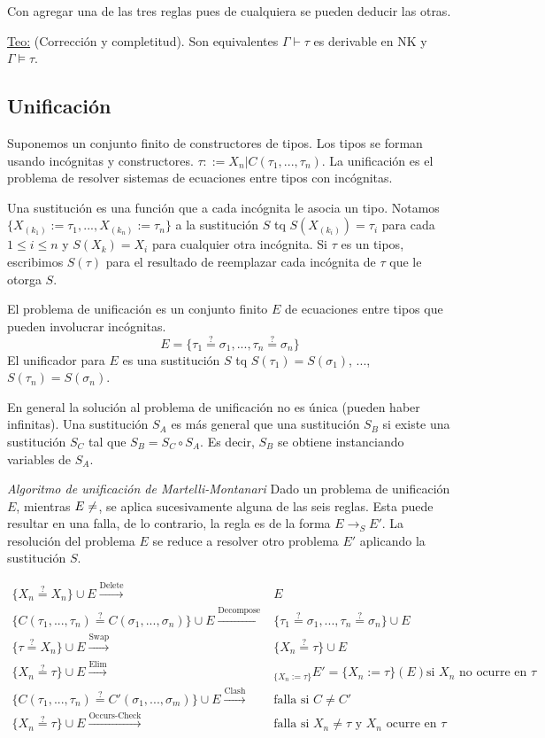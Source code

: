 \documentclass[12pt]{extarticle}
\def\teorema{\underline{Teo:} }
\def\equ{\overset{?}{=}}
\begin{document}
Con agregar una de las tres reglas pues de cualquiera se pueden deducir las otras.

\teorema (Corrección y completitud). Son equivalentes $\Gamma \vdash \tau$ es derivable en NK y $\Gamma \models \tau$.

\subsection{Unificación}
Suponemos un conjunto finito de constructores de tipos. Los tipos se forman usando incógnitas y constructores. $\tau ::= X_n | C(\tau_1, ..., \tau_n)$. La unificación es el problema de resolver sistemas de ecuaciones entre tipos con incógnitas.

Una sustitución es una función que a cada incógnita le asocia un tipo. Notamos $\{X_(k_1) := \tau_1, ..., X_(k_n) := \tau_n\}$ a la sustitución $S$ tq $S(X_(k_i)) = \tau_i$ para cada $1 \leq i \leq n$ y $S(X_k) = X_i$ para cualquier otra incógnita. Si $\tau$ es un tipos, escribimos $S(\tau)$ para el resultado de reemplazar cada incógnita de $\tau$ que le otorga $S$.

El problema de unificación es un conjunto finito $E$ de ecuaciones entre tipos que pueden involucrar incógnitas.
$$E = \{\tau_1 \equ \sigma_1,...,\tau_n \equ \sigma_n\}$$
El unificador para $E$ es una sustitución $S$ tq $S(\tau_1) = S(\sigma_1)$, ..., $S(\tau_n) = S(\sigma_n)$.

En general la solución al problema de unificación no es única (pueden haber infinitas). Una sustitución $S_A$ es más general que una sustitución $S_B$ si existe una sustitución $S_C$ tal que $S_B = S_C \circ S_A$. Es decir, $S_B$ se obtiene instanciando variables de $S_A$.

\textit{Algoritmo de unificación de Martelli-Montanari}
Dado un problema de unificación $E$, mientras $E \neq \empty$, se aplica sucesivamente alguna de las seis reglas. Esta puede resultar en una falla, de lo contrario, la regla es de la forma $E \rightarrow_S E'$. La resolución del problema $E$ se reduce a resolver otro problema $E'$ aplicando la sustitución $S$.

\begin{align*}
  \{X_n \equ X_n\} \cup E \overset{\text{Delete}}{\longrightarrow}& E \\
  \{C(\tau_1,...,\tau_n) \equ C(\sigma_1,...,\sigma_n)\} \cup E \overset{\text{Decompose}}{\longrightarrow}& \{\tau_1 \equ \sigma_1, ..., \tau_n \equ \sigma_n\} \cup E \\
  \{\tau \equ X_n\} \cup E \overset{\text{Swap}}{\longrightarrow}& \{X_n \equ \tau\} \cup E \\
  \{X_n \equ \tau\} \cup E \overset{\text{Elim}}{\longrightarrow}&_{\{X_n := \tau\}} E' = \{X_n := \tau\}(E) \text{si $X_n$ no ocurre en $\tau$}\\
  \{C(\tau_1,...,\tau_n) \equ C'(\sigma_1,...,\sigma_m)\} \cup E \overset{\text{Clash}}{\longrightarrow}& \text{falla si $C \neq C'$} \\
  \{X_n \equ \tau\} \cup E \overset{\text{Occurs-Check}}{\longrightarrow}& \text{falla si $X_n \neq \tau$ y $X_n$ ocurre en $\tau$}
\end{align*}
\end{document}
